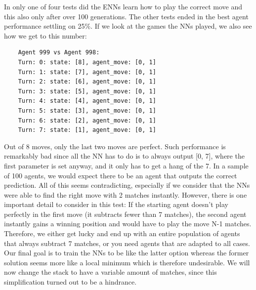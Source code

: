 \documentclass[11pt]{report}
\begin{document}
\begin{enumerate}
\begin{figure}[htbp!]
\begin{adjustbox}{valign=c,margin=-2cm 0pt 0pt 0pt}
\begin{minipage}{1.1\textwidth}
\end{minipage}
    \end{adjustbox}

\end{figure}


    In only one of four tests did the ENNs learn how to play the correct move and this also only after over 100 generations.
    The other tests ended in the best agent performance settling on 25\%.
    If we look at the games the NNs played, we also see how we get to this number:
    \begin{verbatim}
    Agent 999 vs Agent 998:
    Turn: 0: state: [8], agent_move: [0, 1]
    Turn: 1: state: [7], agent_move: [0, 1]
    Turn: 2: state: [6], agent_move: [0, 1]
    Turn: 3: state: [5], agent_move: [0, 1]
    Turn: 4: state: [4], agent_move: [0, 1]
    Turn: 5: state: [3], agent_move: [0, 1]
    Turn: 6: state: [2], agent_move: [0, 1]
    Turn: 7: state: [1], agent_move: [0, 1]
    \end{verbatim}
    Out of 8 moves, only the last two moves are perfect.
    Such performance is remarkably bad since all the NN has to do is to always output [0, 7], where the first parameter is set anyway, and it only has to get a hang of the 7.
    In a sample of 100 agents, we would expect there to be an agent that outputs the correct prediction.
    All of this seems contradicting, especially if we consider that the NNs were able to find the right move with 2 matches instantly.
    However, there is one important detail to consider in this test:
    If the starting agent doesn't play perfectly in the first move (it subtracts fewer than 7 matches), the second agent instantly gains a winning position and would have to play the move N-1 matches.
    Therefore, we either get lucky and end up with an entire population of agents that always subtract 7 matches, or you need agents that are adapted to all cases.
    Our final goal is to train the NNs to be like the latter option whereas the former solution seems more like a local minimum which is therefore undesirable.
    We will now change the stack to have a variable amount of matches, since this simplification turned out to be a hindrance.

\end{enumerate}
\end{document}

